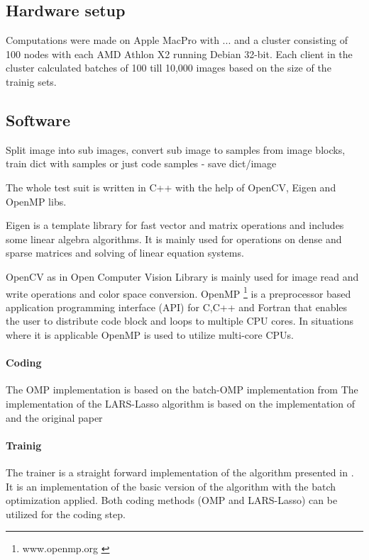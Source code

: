 \subsection*{Hardware setup}
Computations were made on Apple MacPro with ... 
and a cluster consisting of 100 nodes with each AMD Athlon X2  running Debian 32-bit. 
Each client in the cluster calculated batches of 100 till 10,000 images based on the size of the trainig sets.

\subsection*{Software}

Split image into sub images, convert sub image to samples from image blocks, 
train dict with samples or just code samples - save dict/image

The whole test suit is written in C++ with the help  of OpenCV, Eigen and OpenMP libs.

Eigen \cite{Eigen} is a template library for fast vector and matrix operations and includes some linear algebra algorithms.
It is mainly used for operations on dense and sparse matrices and solving of linear equation systems.

OpenCV \cite{OpenCV} as in Open Computer Vision Library is mainly used for image read and write operations and color space conversion.
OpenMP \footnote{www.openmp.org \cite{OpenMP}} is a preprocessor based application programming interface (API) for C,C++ and Fortran that enables 
the user to distribute code block and loops to multiple CPU cores. 
In situations where it is applicable OpenMP is used to utilize multi-core CPUs. 

\paragraph{Coding}
The OMP implementation is based on the batch-OMP implementation from \cite{Rubinstein}
The implementation of the LARS-Lasso algorithm is based on the implementation of \cite{Strand2005} and the original paper \cite{Efron2004}

\paragraph{Trainig}
The \trainDL trainer is a straight forward implementation of the algorithm presented in \cite{Mairal2010}.
It is an implementation of the basic version of the algorithm with the batch optimization applied. 
Both coding methods (OMP and LARS-Lasso) can be utilized for the coding step.

